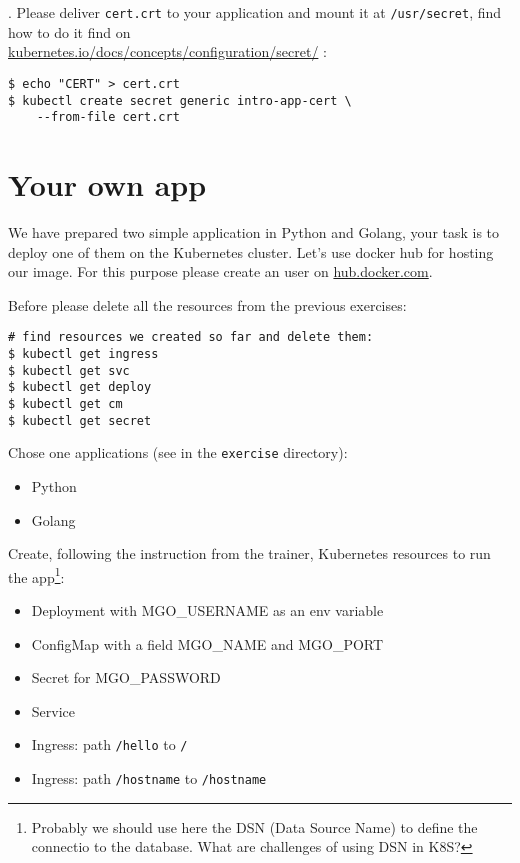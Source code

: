 \documentclass[12pt, letterpaper]{article}
\begin{document}
. Please deliver \verb|cert.crt| to your application and mount it at \verb|/usr/secret|, find how to do it find on\\ \href{https://kubernetes.io/docs/concepts/configuration/secret/}{kubernetes.io/docs/concepts/configuration/secret/} :

\begin{verbatim}
$ echo "CERT" > cert.crt
$ kubectl create secret generic intro-app-cert \
    --from-file cert.crt
\end{verbatim}

%
\section{Your own app}
We have prepared two simple application in Python and Golang, your task is to deploy one of them on the Kubernetes cluster. Let's use docker hub for hosting our image. For this purpose please create an user on \href{https://hub.docker.com}{hub.docker.com}.

\bigskip
Before please delete all the resources from the previous exercises:

\begin{verbatim}
# find resources we created so far and delete them:
$ kubectl get ingress
$ kubectl get svc
$ kubectl get deploy
$ kubectl get cm
$ kubectl get secret
\end{verbatim}


Chose one applications (see in the \verb|exercise| directory):

\begin{itemize}
\item Python
\item Golang
\end{itemize}

Create, following the instruction from the trainer, Kubernetes resources to run the app\footnote{Probably we should use here the {\small DSN} (Data Source Name) to define the connectio to the database. What are challenges of using {\small DSN} in {\small K8S}?}:

\begin{itemize}
\item Deployment with {\small MGO\_USERNAME} as an env variable
\item ConfigMap with a field {\small MGO\_NAME} and {\small MGO\_PORT}
\item Secret for {\small MGO\_PASSWORD}
\item Service
\item Ingress: path \verb|/hello| to \verb|/|
\item Ingress: path \verb|/hostname| to \verb|/hostname|
\end{itemize}%
\end{document}
